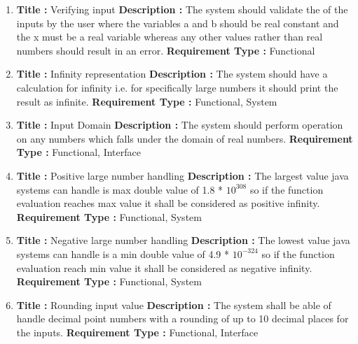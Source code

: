 \documentclass[a4paper, 11pt]{article}
\begin{document}
\begin{enumerate}
    \item \textbf{Title :} Verifying input \newline 
    \textbf{Description : } The system should validate the of the inputs by the user where the variables a and b should be real constant and the x must be a real variable whereas any other values rather than real numbers should result in an error. \newline
    \textbf{Requirement Type : } Functional
    
    \item \textbf{Title :} Infinity representation \newline 
    \textbf{Description : } The system should have a calculation for infinity i.e. for specifically large numbers it should print the result as infinite. \newline
    \textbf{Requirement Type : } Functional, System
    
    \item \textbf{Title :} Input Domain \newline 
    \textbf{Description : } The system should perform operation on any numbers which falls under the domain of real numbers. \newline
    \textbf{Requirement Type : } Functional, Interface
    
    \item \textbf{Title :} Positive large number handling \newline 
    \textbf{Description : } The largest value java systems can handle is max double value of 1.8 * $10^{308}$ so if the function evaluation reaches max value it shall be considered as positive infinity. \newline
    \textbf{Requirement Type : } Functional, System
    
    \item \textbf{Title :} Negative large number handling \newline 
    \textbf{Description : } The lowest value java systems can handle is a min double value of 4.9 * $10^{-324}$ so if the function evaluation reach min value it shall be considered as negative infinity. \newline
    \textbf{Requirement Type : } Functional, System
    
    \item \textbf{Title :} Rounding input value \newline 
    \textbf{Description : } The system shall be able of handle decimal point numbers with a rounding of up to 10 decimal places for the inputs. \newline
    \textbf{Requirement Type : } Functional, Interface
    

\end{enumerate}
\end{document}
